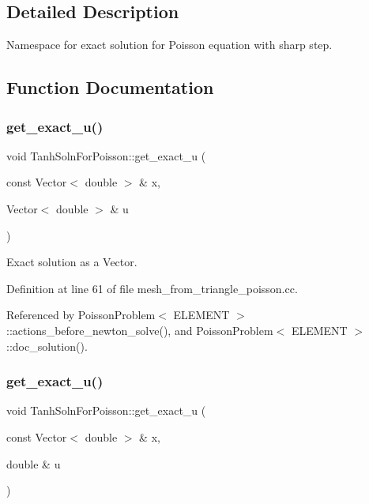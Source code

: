 \subsection{Detailed Description}
Namespace for exact solution for Poisson equation with sharp step. 

\subsection{Function Documentation}
\mbox{\label{namespaceTanhSolnForPoisson_af7896e9c18ce6438c73ae2a875e8b7de}} 
\subsubsection{\texorpdfstring{get\+\_\+exact\+\_\+u()}{get\_exact\_u()}\hspace{0.1cm}{\footnotesize\ttfamily [1/2]}}
{\footnotesize\ttfamily void Tanh\+Soln\+For\+Poisson\+::get\+\_\+exact\+\_\+u (\begin{DoxyParamCaption}\item[{const Vector$<$ double $>$ \&}]{x,  }\item[{Vector$<$ double $>$ \&}]{u }\end{DoxyParamCaption})}



Exact solution as a Vector. 



Definition at line 61 of file mesh\+\_\+from\+\_\+triangle\+\_\+poisson.\+cc.



Referenced by Poisson\+Problem$<$ E\+L\+E\+M\+E\+N\+T $>$\+::actions\+\_\+before\+\_\+newton\+\_\+solve(), and Poisson\+Problem$<$ E\+L\+E\+M\+E\+N\+T $>$\+::doc\+\_\+solution().

\mbox{\label{namespaceTanhSolnForPoisson_af197decab980d38d2037032780723984}} 
\subsubsection{\texorpdfstring{get\+\_\+exact\+\_\+u()}{get\_exact\_u()}\hspace{0.1cm}{\footnotesize\ttfamily [2/2]}}
{\footnotesize\ttfamily void Tanh\+Soln\+For\+Poisson\+::get\+\_\+exact\+\_\+u (\begin{DoxyParamCaption}\item[{const Vector$<$ double $>$ \&}]{x,  }\item[{double \&}]{u }\end{DoxyParamCaption})}



